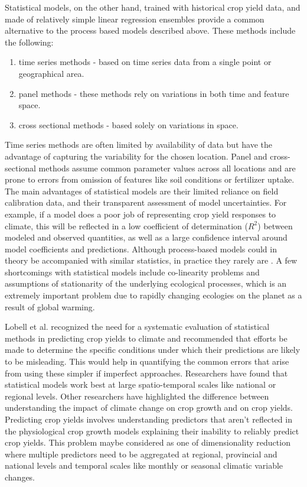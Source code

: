 \documentclass[conference]{IEEEtran}
\begin{document}
Statistical models, on the other hand, trained with historical crop yield data, and made of relatively simple linear regression ensembles provide  a common alternative to the process based models described above. These methods include the following:
\begin{enumerate}
  \item time series methods - based on time series data from a single point or geographical area.
  \item panel methods - these methods rely on variations in both time and feature space. 
  \item cross sectional methods - based solely on variations in space.
\end{enumerate}
Time series methods are often limited by availability of data but have the advantage of capturing the variability for the chosen location. Panel and cross-sectional methods assume common parameter values across all locations and are prone to errors from omission of features like soil conditions or fertilizer uptake. The main advantages of statistical models are their limited reliance on field calibration data, and their transparent assessment of model uncertainties. For example, if a model does a poor job of representing crop yield responses to climate, this will be reflected in a low coefficient of determination ($R^2$) between modeled and observed quantities, as well as a large confidence interval around model coefficients and predictions. Although process-based models could in theory be accompanied with similar statistics, in practice they rarely are \cite{Lobell2010}. A few shortcomings with statistical models include co-linearity problems and assumptions of stationarity of the underlying ecological processes, which is an extremely important problem due to rapidly changing ecologies on the planet as a result of global warming. 

Lobell et al.\cite{Lobell2010} recognized the need for a systematic evaluation of statistical methods in predicting crop yields to climate and recommended that efforts be made to determine the specific conditions under which their predictions are likely to be misleading. This would help in quantifying the common errors that arise from using these simpler if imperfect approaches. Researchers \cite{Shi2013} \cite{lobell2009climate} have found that statistical models work best at large spatio-temporal scales like national or regional levels. Other researchers have highlighted the difference between understanding the impact of climate change on crop growth and on crop yields. Predicting crop yields involves understanding predictors that aren't reflected in the physiological crop growth models explaining their inability to reliably predict crop yields. This problem maybe considered as one of dimensionality reduction where multiple predictors need to be aggregated at regional, provincial and national levels and temporal scales like monthly or seasonal climatic variable changes.
\end{document}
